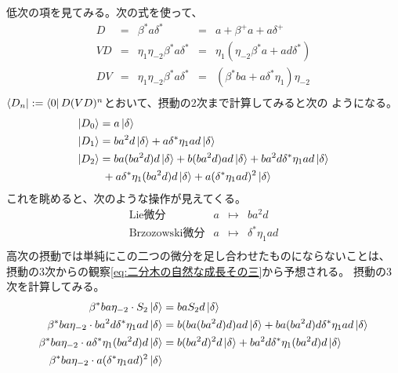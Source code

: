 {	低次の項を見てみる。次の式を使って、
	\begin{equation*}\begin{array}{rclcl}
		D &=& \beta^*a\delta^* &=& a+\beta^+a+a\delta^+ \\
		VD &=& \eta_1\eta_{-2}\beta^*a\delta^* 
			&=& \eta_1(\eta_{-2}\beta^*a + ad\delta^*) \\
		DV &=& \eta_1\eta_{-2}\beta^*a\delta^* 
			&=& (\beta^*ba + a\delta^*\eta_1)\eta_{-2} \\
	\end{array}\end{equation*}
	$\mathinner{\langle{D_n}|}:=\mathinner{\langle{0}|}D(VD)^n$とおいて、摂動の$2$次まで計算してみると次の
	ようになる。
	\begin{equation*}\begin{split}
		\mathinner{|{D_0}\rangle} &= a\mathinner{|{\delta}\rangle} \\
		\mathinner{|{D_1}\rangle} &= ba^2d\mathinner{|{\delta}\rangle} + a\delta^*\eta_1ad\mathinner{|{\delta}\rangle} \\
		\mathinner{|{D_2}\rangle} &= ba(ba^2d)d\mathinner{|{\delta}\rangle} + b(ba^2d)ad\mathinner{|{\delta}\rangle}
			+ ba^2d\delta^*\eta_1ad\mathinner{|{\delta}\rangle} \\
		&\; + a\delta^*\eta_1(ba^2d)d\mathinner{|{\delta}\rangle}
			+ a(\delta^*\eta_1ad)^2\mathinner{|{\delta}\rangle} \\
	\end{split}\end{equation*}
	これを眺めると、次のような操作が見えてくる。
	\begin{equation*}\begin{array}{lrcll}
		\text{Lie微分} & a &\mapsto& ba^2d \\
		\text{Brzozowski微分} & a &\mapsto& \delta^*\eta_1ad \\
	\end{array}\end{equation*}
	高次の摂動では単純にこの二つの微分を足し合わせたものにならないことは、
	摂動の$3$次からの観察\eqref{eq:二分木の自然な成長その三}から予想される。
	摂動の$3$次を計算してみる。
	\begin{equation*}\begin{split}
		\beta^*ba\eta_{-2}\cdot S_2\ket{\delta} &= baS_2d\ket{\delta} \\
		\beta^*ba\eta_{-2}\cdot ba^2d\delta^*\eta_1ad\ket{\delta} 
			&= b(ba(ba^2d)d)ad\ket{\delta} 
			+ ba(ba^2d)d\delta^*\eta_1ad\ket{\delta} \\
		\beta^*ba\eta_{-2}\cdot a\delta^*\eta_1(ba^2d)d\ket{\delta}
			&= b(ba^2d)^2d\ket{\delta}
			+ ba^2d\delta^*\eta_1(ba^2d)d\ket{\delta} \\
		\beta^*ba\eta_{-2}\cdot a(\delta^*\eta_1ad)^2\ket{\delta}

\end{split}
\end{equation*}}
